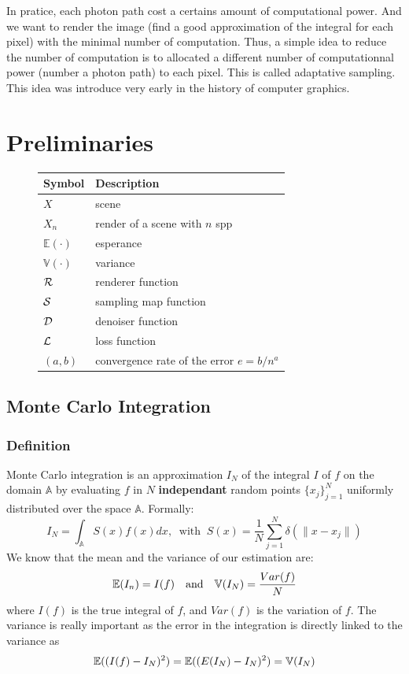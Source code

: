 \documentclass{classeENS}
\begin{document}
\par In pratice, each photon path cost a certains amount of computational power.
And we want to render the image (find a good approximation of the integral for each pixel) 
with the minimal number of computation. Thus, a simple idea to reduce the number of
computation is to allocated a different number of computationnal power (number a photon path)
to each pixel. This is called adaptative sampling. This idea was introduce very early in
the history of computer graphics.
\section{Preliminaries}

\begin{figure}[H]
    \centering
    \begin{tabular}{C{2cm} L{10cm}}
    \hline  
        Symbol & Description
    \tabularnewline 
    \hline
        $X$ & scene
    \tabularnewline
        $X_n$ & render of a scene with $n$ spp
    \tabularnewline
        $\mathbb E(\cdot)$ & esperance
    \tabularnewline
        $\mathbb V(\cdot)$ & variance
    \tabularnewline
        $\mathcal R$ & renderer function
    \tabularnewline
        $\mathcal S$ & sampling map function
    \tabularnewline
        $\mathcal D$ & denoiser function
    \tabularnewline
        $\mathcal L$ & loss function
    \tabularnewline
        $(a,b)$ & convergence rate of the error $e = b/n^a$
    \tabularnewline
    \hline 
    \end{tabular}
\end{figure}

\subsection{Monte Carlo Integration}

\subsubsection{Definition}\label{montecarlo}

Monte Carlo integration is an approximation $I_N$ of the integral 
$I$ of $f$ on the domain $\mathbb A$ by evaluating $f$ in $N$ \textbf{independant} 
random points $\{x_j\}_{j=1}^N$ uniformly distributed over the 
space $\mathbb A$. Formally:
\begin{equation}
    \label{eq:montecarlo}
    I_N = \int_{\mathbb A} S(x)f(x)dx, 
        \: \text{ with } \:
    S(x) = \frac{1}{N} \sum_{j=1}^N \delta(\lVert x-x_j \rVert)
\end{equation}
We know that the mean and the variance of our estimation are:
\begin{equation}
    \mathbb E(I_n) = I(f) \quad \text{and} \quad \mathbb V(I_N) = \frac{Var(f)}{N}
\end{equation}
where $I(f)$ is the true integral of $f$, and $Var(f)$ is the variation of $f$. 
The variance is really important as the error in the integration is directly 
linked to the variance as
\begin{align*}   \label{eq:variance}
    \mathbb E((I(f) - I_N)^2) = \mathbb E((E(I_N) - I_N)^2) = \mathbb V(I_N)
\end{align*}
\end{document}
